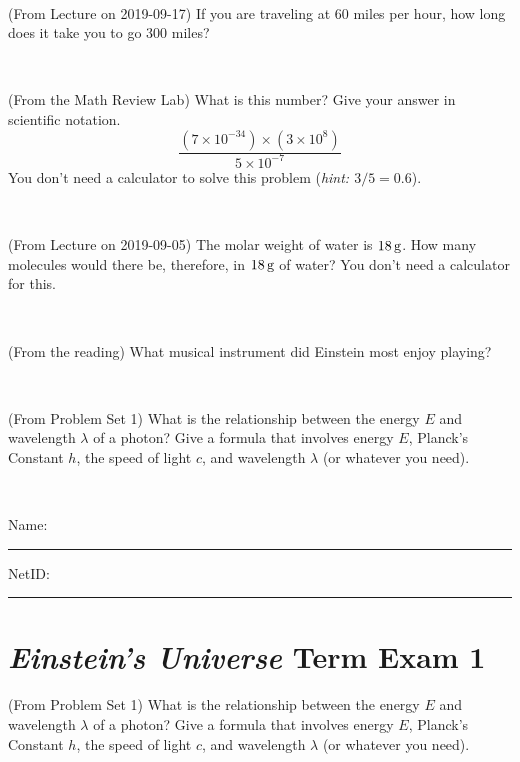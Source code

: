 \documentclass[12pt, letterpaper]{article}
\begin{document}
\vfill ~

\begin{problem} (From Lecture on 2019-09-17)
If you are traveling at 60 miles per hour, how long does
it take you to go 300 miles?
\end{problem}


\vfill ~


\clearpage


\begin{problem} (From the Math Review Lab)
What is this number? Give your answer in scientific notation.
$$
\frac{(7\times10^{-34})\times(3\times10^8)}{5\times10^{-7}}
$$
You don't need a calculator to solve this problem (\textit{hint: $3/5=0.6$}).
\end{problem}


\vfill ~

\begin{problem} (From Lecture on 2019-09-05)
The molar weight of water is $18\,\mathrm{g}$. How many molecules would there
be, therefore, in $18\,\mathrm{g}$ of water? You don't need a calculator for
this.
\end{problem}


\vfill ~

\begin{problem} (From the reading)
What musical instrument did Einstein most enjoy playing?
\end{problem}


\vfill ~

\begin{problem} (From Problem Set 1)
What is the relationship between the energy $E$ and wavelength
$\lambda$ of a photon? Give a formula that involves energy $E$,
Planck's Constant $h$, the speed of light $c$, and wavelength
$\lambda$ (or whatever you need).
\end{problem}

\vfill ~


\cleardoublepage



\noindent
Name: \rule[-1ex]{0.60\textwidth}{0.1pt}
NetID: \rule[-1ex]{0.20\textwidth}{0.1pt}

\section*{\textsl{Einstein's Universe} Term Exam 1}
\setcounter{problem}{1}


\begin{problem} (From Problem Set 1)
What is the relationship between the energy $E$ and wavelength
$\lambda$ of a photon? Give a formula that involves energy $E$,
Planck's Constant $h$, the speed of light $c$, and wavelength
$\lambda$ (or whatever you need).
\end{problem}
\end{document}
